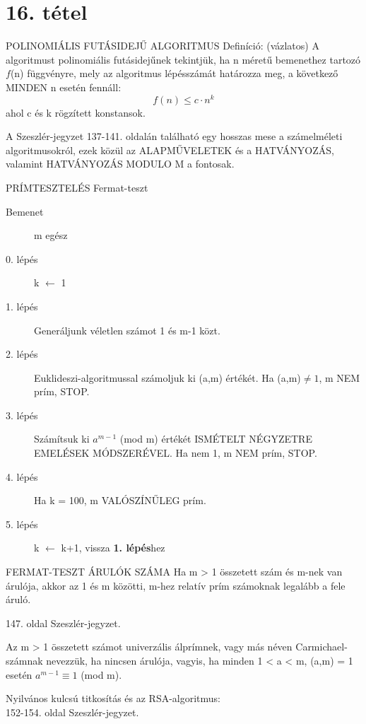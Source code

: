 \section{16. tétel}

\begin{definicio}{POLINOMIÁLIS FUTÁSIDEJŰ ALGORITMUS}
Definíció: (vázlatos) A algoritmust polinomiális futásidejűnek tekintjük, ha n méretű bemenethez tartozó $f$(n) függvényre, mely az algoritmus lépésszámát határozza meg, a következő MINDEN n esetén fennáll:
$$f(n) \leq c\cdot n^k$$ ahol c és k rögzített konstansok.
\end{definicio}

A Szeszlér-jegyzet 137-141. oldalán található egy hosszas mese a számelméleti algoritmusokról, ezek közül az ALAPMŰVELETEK és a HATVÁNYOZÁS, valamint HATVÁNYOZÁS MODULO M a fontosak.

\begin{tetel}{PRÍMTESZTELÉS Fermat-teszt}
\begin{description}
\item[Bemenet]m egész
\item[0. lépés]k $\leftarrow$ 1
\item[1. lépés]Generáljunk véletlen számot 1 és m-1 közt.
\item[2. lépés]Euklideszi-algoritmussal számoljuk ki (a,m) értékét. Ha (a,m)$\neq1$, m NEM prím, STOP.
\item[3. lépés]Számítsuk ki $a^{m-1}$ (mod m) értékét ISMÉTELT NÉGYZETRE EMELÉSEK MÓDSZERÉVEL. Ha nem 1, m NEM prím, STOP.
\item[4. lépés]Ha k = 100, m VALÓSZÍNŰLEG prím.
\item[5. lépés]k $\leftarrow$ k+1, vissza \textbf{1. lépés}hez
\end{description}
\end{tetel}

\begin{tetel}{FERMAT-TESZT ÁRULÓK SZÁMA}
Ha m > 1 összetett szám és m-nek van árulója, akkor az 1 és m közötti, m-hez relatív prím számoknak legalább a fele áruló.
\end{tetel}

\begin{bizonyitas}{}
147. oldal Szeszlér-jegyzet.
\end{bizonyitas}

\begin{definicio}{}
Az m > 1 összetett számot univerzális álprímnek, vagy más néven Carmichael-számnak nevezzük, ha nincsen árulója, vagyis, ha minden 1 < a < m, (a,m) = 1 esetén $a^{m-1} \equiv 1$ (mod m).
\end{definicio}

Nyilvános kulcsú titkosítás és az RSA-algoritmus:\\
152-154. oldal Szeszlér-jegyzet.
